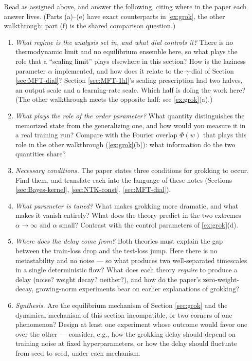 \documentclass[11pt]{article}
\begin{document}
\begin{exercise}
\label{ex:grok-lazy}
Read \cite{kumar2024grokking} as assigned above, and answer the following, citing where in the paper each answer lives. (Parts (a)--(e) have exact counterparts in \cref{ex:grok}, the other walkthrough; part (f) is the shared comparison question.)
\begin{enumerate}
    \item \emph{What regime is the analysis set in, and what dial controls it?} There is no thermodynamic limit and no equilibrium ensemble here, so what plays the role that a ``scaling limit'' plays elsewhere in this section? How is the laziness parameter $\alpha$ implemented, and how does it relate to the $\gamma$-dial of Section \ref{sec:MFT-dial}? Section \ref{sec:MFT-1hl}'s scaling prescription had two halves, an output scale and a learning-rate scale. Which half is doing the work here? (The other walkthrough meets the opposite half: see \cref{ex:grok}(a).)
    \item \emph{What plays the role of the order parameter?} What quantity distinguishes the memorized state from the generalizing one, and how would you measure it in a real training run? Compare with the Fourier overlap $\Phi(w)$ that plays this role in the other walkthrough (\cref{ex:grok}(b)): what information do the two quantities share?
    \item \emph{Necessary conditions.} The paper states three conditions for grokking to occur. Find them, and translate each into the language of these notes (Sections \ref{sec:Bayes-kernel}, \ref{sec:NTK-const}, \ref{sec:MFT-dial}).
    \item \emph{What parameter is tuned?} What makes grokking more dramatic, and what makes it vanish entirely? What does the theory predict in the two extremes $\alpha\to\infty$ and $\alpha$ small? Contrast with the control parameters of \cref{ex:grok}(d).
    \item \emph{Where does the delay come from?} Both theories must explain the gap between the train-loss drop and the test-loss jump. Here there is no metastability and no noise --- so what produces two well-separated timescales in a single deterministic flow? What does each theory \emph{require} to produce a delay (noise? weight decay? neither?), and how do the paper's zero-weight-decay, growing-norm experiments bear on earlier explanations of grokking?
    \item \emph{Synthesis.} Are the equilibrium mechanism of Section \ref{sec:grok} and the dynamical mechanism of this section incompatible, or two corners of one phenomenon? Design at least one experiment whose outcome would favor one over the other --- consider, e.g., how the grokking delay should depend on training noise at fixed hyperparameters, or how the delay should fluctuate from seed to seed, under each mechanism.
\end{enumerate}
\end{exercise}
\end{document}
